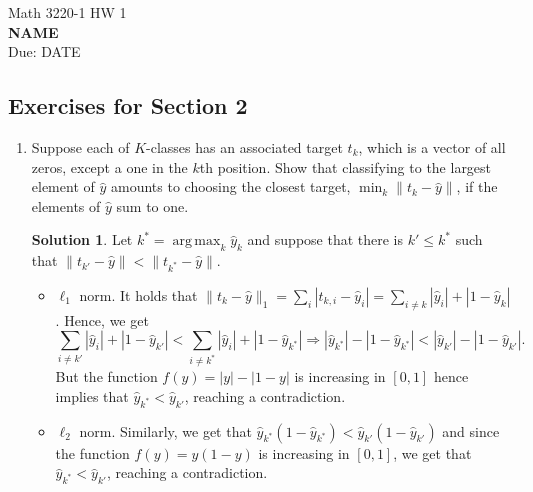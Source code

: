 \documentclass[]{book}
\theoremstyle{definition}
\newtheorem*{soln}{Solution}
\DeclareMathOperator*{\argmax}{arg\,max}
\begin{document}
\begin{center}
	{\Large Math 3220-1 \hspace{0.5cm} HW 1}\\
	\textbf{NAME}\\ %
	Due: DATE %
\end{center}

\vspace{0.2 cm}


\subsection*{Exercises for Section 2}

\begin{enumerate}
	\item\label{k-classes} Suppose each of $K$-classes has an associated target
	$t_k$, which is a vector of all zeros, except a one in the $k$th position.
	Show that classifying to the largest element of $\hat{y}$ amounts to
	choosing the closest target, $\min_k\|t_k-\hat{y}\|$, if the elements of
	$\hat{y}$ sum to one.
	\begin{soln}
		\newcommand{\normone}[1]{\sum_{i\ne #1}|\hat{y}_i|+|1-\hat{y}_{#1}|} Let
		$k^*=\argmax_k \hat{y}_k$ and suppose that there is $k'\le k^*$ such
		that $\|t_{k'}-\hat{y}\| < \|t_{k^*}-\hat{y}\|$.
		\begin{itemize}
			\item $\ell_1$ norm. It holds that
			      $\|t_k-\hat{y}\|_1=\sum_i|t_{k,i}-\hat{y}_i|=\sum_{i\ne
					      k}|\hat{y}_i|+|1-\hat{y}_k|$. Hence, we get
			      \begin{equation}\label{2.1-inequality}
				      \normone{k'} < \normone{k^*}\Rightarrow |\hat{y}_{k^*}|-|1-\hat{y}_{k^*}|
				      < |\hat{y}_{k'}|-|1-\hat{y}_{k'}|.
			      \end{equation}
			      But the function $f(y)=|y|-|1-y|$ is increasing in $[0,1]$
			      hence~ implies that
			      $\hat{y}_{k^*}<\hat{y}_{k'}$, reaching a contradiction.
			\item $\ell_2$ norm. Similarly, we get that
			      $\hat{y}_{k^*}(1-\hat{y}_{k^*})<\hat{y}_{k'}(1-\hat{y}_{k'})$
			      and since the function $f(y)=y(1-y)$ is increasing in $[0,1]$,
			      we get that $\hat{y}_{k^*}<\hat{y}_{k'}$, reaching a
			      contradiction.
		\end{itemize}
	\end{soln}


\end{enumerate}
\end{document}
